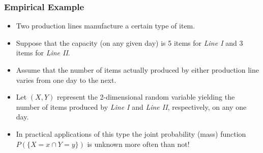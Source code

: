 \documentclass[notes=show,handout]{beamer}\usepackage[]{graphicx}\usepackage[]{color}
\newenvironment{stepitemize}{\begin{itemize}[<+->]}{\end{itemize} }
\renewcommand{\Pr}{P}
\begin{document}
\begin{frame}%

\frametitle{Empirical Example}

\begin{example}

\begin{stepitemize}
\item Two production lines manufacture a certain type of item.

\item Suppose that the capacity (on any given day) is 5 items for \emph{Line
I }and 3 items for \emph{Line II}.

\item Assume that the number of items actually produced by either production
line varies from one day to the next.

\item Let $(X,Y)$ represent the 2-dimensional random variable yielding the
number of items produced by \emph{Line I} and \emph{Line II}, respectively,
on any one day.

\item In practical applications of this type the joint probability (mass)
function $\Pr(\{X=x\cap Y=y\})$ is unknown more often than not!
\end{stepitemize}
\end{example}

\end{frame}%
\end{document}
